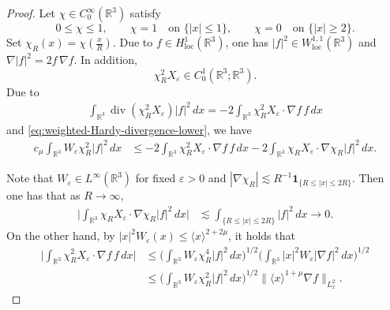 \documentclass[11pt,twoside]{article}
\theoremstyle{plain}
\theoremstyle{definition}
\theoremstyle{assumption}
\numberwithin{equation}{section}
\begin{document}
\begin{proof}
		Let \(\chi\in C_0^\infty(\mathbb R^3)\) satisfy
		\begin{equation*}
			0\le\chi\le1,
			\qquad
			\chi=1
			\quad\text{on }\{|x|\le1\},
			\qquad
			\chi=0
			\quad\text{on }\{|x|\ge2\}.
		\end{equation*}
		Set $\chi_R(x)=\chi\left(\frac{x}{R}\right)$.
		Due to \(f\in H^1_{\mathrm{loc}}(\mathbb R^3)\), one has
		$|f|^2\in W^{1,1}_{\mathrm{loc}}(\mathbb R^3)$ and
		$\nabla |f|^2
		=2f\,\nabla f$.
		In addition,
		\[
		\chi_R^2X_\varepsilon
		\in C_0^1(\mathbb R^3;\mathbb R^3).
		\]
		Due to
		\begin{equation}
			\label{eq:weighted-Hardy-weak-integration-by-parts}
			\begin{aligned}
				\int_{\mathbb R^3}
				\operatorname{div}
				\left(
				\chi_R^2X_\varepsilon
				\right)
				|f|^2\,dx
				=-2\int_{\mathbb R^3}
				\chi_R^2X_\varepsilon
				\cdot\nabla f\,
				f\,dx
			\end{aligned}
		\end{equation}
		and \eqref{eq:weighted-Hardy-divergence-lower}, we have
		\begin{equation}
			\label{eq:weighted-Hardy-cutoff-identity}
			\begin{aligned}
				c_\mu
				\int_{\mathbb R^3}
				W_\varepsilon\chi_R^2|f|^2\,dx
				&\le
				-2\int_{\mathbb R^3}
				\chi_R^2X_\varepsilon
				\cdot\nabla f\,
				 f\,dx
				-2\int_{\mathbb R^3}
				\chi_RX_\varepsilon
				\cdot\nabla\chi_R
				|f|^2\,dx.
			\end{aligned}
		\end{equation}
		
		Note that \(W_\varepsilon\in L^\infty(\mathbb R^3)\) for fixed
		\(\varepsilon>0\) and
		$|\nabla\chi_R|\lesssim	R^{-1}\boldsymbol 1_{\{R\le |x|\le2R\}}$.
		Then one has that as \(R\to\infty\),
		\begin{equation}
			\label{eq:weighted-Hardy-cutoff-error-vanishes}
			\begin{aligned}
				\big|
				\int_{\mathbb R^3}
				\chi_RX_\varepsilon
				\cdot\nabla\chi_R
				|f|^2\,dx
				\big|
				&\lesssim
				\int_{\{R\le |x|\le2R\}}
				|f|^2\,dx
				\longrightarrow0.
			\end{aligned}
		\end{equation}
		On the other hand, by
		$|x|^2W_\varepsilon(x)\le
		\langle x\rangle^{2+2\mu}$, it holds that
		\begin{equation}
			\label{eq:weighted-Hardy-main-term}
			\begin{aligned}
				\big|
				\int_{\mathbb R^3}
				\chi_R^2X_\varepsilon
				\cdot\nabla f\,
				f\,dx
				\big|
				&\le
				\big(
				\int_{\mathbb R^3}
				W_\varepsilon\chi_R^4|f|^2\,dx
				\big)^{1/2}
				\big(
				\int_{\mathbb R^3}
				|x|^2W_\varepsilon
				|\nabla f|^2\,dx
				\big)^{1/2}\\
				&\le
				\big(
				\int_{\mathbb R^3}
				W_\varepsilon\chi_R^2|f|^2\,dx
				\big)^{1/2}
				\big\|
				\langle x\rangle^{1+\mu}
				\nabla f
				\big\|_{L^2_x}.
			\end{aligned}
		\end{equation}
		

\end{proof}
\end{document}
